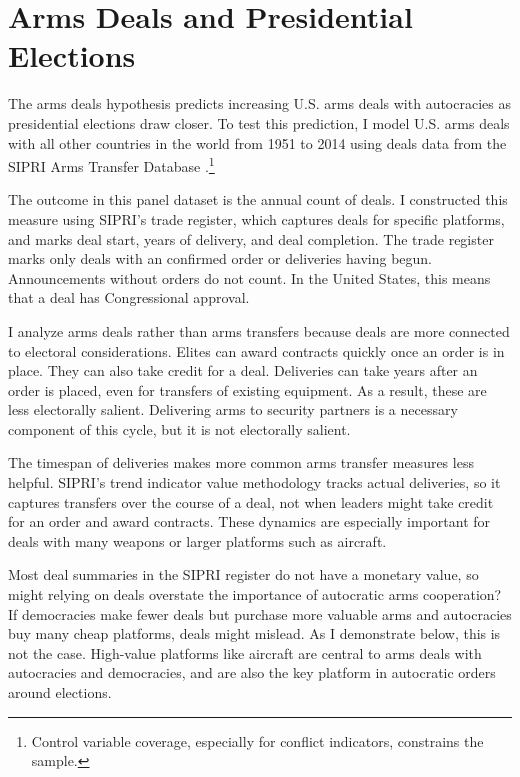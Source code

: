 \documentclass[12pt]{article}
\begin{document}
\section{Arms Deals and Presidential Elections}


The arms deals hypothesis predicts increasing U.S. arms deals with autocracies as presidential elections draw closer.
To test this prediction, I model U.S. arms deals with all other countries in the world from 1951 to 2014 using deals data from the SIPRI Arms Transfer Database \citep{SIPRI2021}.\footnote{Control variable coverage, especially for conflict indicators, constrains the sample.}



The outcome in this panel dataset is the annual count of deals.
I constructed this measure using SIPRI's trade register, which captures deals for specific platforms, and marks deal start, years of delivery, and deal completion.
The trade register marks only deals with an confirmed order or deliveries having begun. 
Announcements without orders do not count. 
In the United States, this means that a deal has Congressional approval.


I analyze arms deals rather than arms transfers because deals are more connected to electoral considerations.
Elites can award contracts quickly once an order is in place.
They can also take credit for a deal. 
Deliveries can take years after an order is placed, even for transfers of existing equipment. 
As a result, these are less electorally salient. 
Delivering arms to security partners is a necessary component of this cycle, but it is not electorally salient. 


The timespan of deliveries makes more common arms transfer measures less helpful.
SIPRI's trend indicator value methodology tracks actual deliveries, so it captures transfers over the course of a deal, not when leaders might take credit for an order and award contracts.
These dynamics are especially important for deals with many weapons or larger platforms such as aircraft. 


Most deal summaries in the SIPRI register do not have a monetary value, so might relying on deals overstate the importance of autocratic arms cooperation? 
If democracies make fewer deals but purchase more valuable arms and autocracies buy many cheap platforms, deals might mislead. 
As I demonstrate below, this is not the case. 
High-value platforms like aircraft are central to arms deals with autocracies and democracies, and are also the key platform in autocratic orders around elections. 
\end{document}
